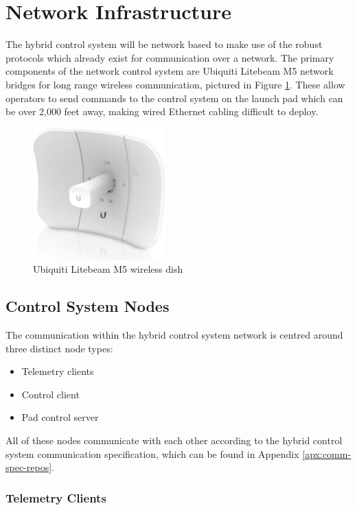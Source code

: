 \section{Network Infrastructure}

The hybrid control system will be network based to make use of the robust protocols which already exist for
communication over a network. The primary components of the network control system are Ubiquiti Litebeam M5 network bridges for
long range wireless communication, pictured in Figure \ref{fig:ubiquiti-dish}. These allow operators to send commands to the
control system on the launch pad which can be over 2,000 feet away, making wired Ethernet cabling difficult to deploy.

\begin{figure}[H]
    \center
    \includegraphics[width=2in]{assets/images/ubiquiti-dish.jpg}
    \caption{Ubiquiti Litebeam M5 wireless dish \cite{ubiquiti-dish}}
    \label{fig:ubiquiti-dish}
\end{figure}

\subsection{Control System Nodes}

The communication within the hybrid control system network is centred around three distinct node types:

\begin{itemize}
    \item Telemetry clients
    \item Control client
    \item Pad control server
\end{itemize}

All of these nodes communicate with each other according to the hybrid control system communication specification,
which can be found in Appendix \ref{apx:comm-spec-repos}.

\subsubsection{Telemetry Clients}

